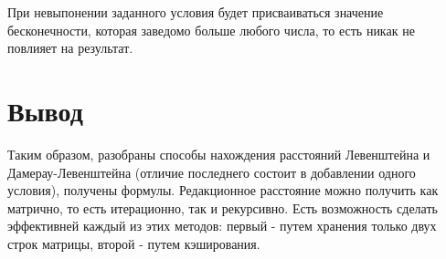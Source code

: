 При невыпонении заданного условия будет присваиваться значение бесконечности, которая заведомо больше любого числа, то есть никак не повлияет на результат.

\section{Вывод}
Таким образом, разобраны способы нахождения расстояний Левенштейна и Дамерау-Левенштейна (отличие последнего состоит в добавлении одного условия), получены формулы. Редакционное расстояние можно получить как матрично, то есть итерационно, так и рекурсивно. Есть возможность сделать эффективней каждый из этих методов: первый - путем хранения только двух строк матрицы, второй - путем кэширования. 